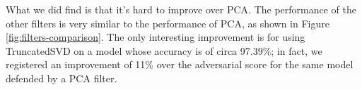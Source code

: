 What we did find is that it's hard to improve over PCA. The performance
of the other filters is very similar to the performance of PCA, as
shown in Figure \ref{fig:filters-comparison}. The only interesting
improvement is for using TruncatedSVD on a model whose accuracy is of
circa 97.39\%; in fact, we registered an improvement of 11\% over the
adversarial score for the same model defended by a PCA filter.
